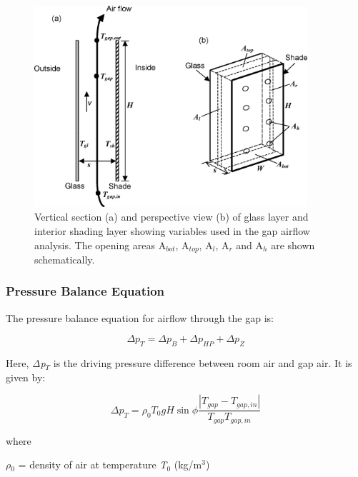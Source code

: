 \begin{figure}[hbtp] %
\centering
\includegraphics[width=0.9\textwidth, height=0.9\textheight, keepaspectratio=true]{media/image1670.png}
\caption{Vertical section (a) and perspective view (b) of glass layer and interior shading layer showing variables used in the gap airflow analysis. The opening areas A\(_{bot}\), A\(_{top}\), A\(_{l}\), A\(_{r}\) and A\(_{h}\) are shown schematically. \protect \label{fig:vertical-section-a-and-perspective-view-b-of}}
\end{figure}

\subsubsection{Pressure Balance Equation}\label{pressure-balance-equation}

The pressure balance equation for airflow through the gap is:

\begin{equation}
\Delta {p_T} = \Delta {p_B} + \Delta {p_{HP}} + \Delta {p_Z}
\label{eq:PressureBalanceEquationAirflow}
\end{equation}

Here, \emph{Δp\(_{T}\)} is the driving pressure difference between room air and gap air. It is given by:

\begin{equation}
\Delta {p_T} = {\rho_0}{T_0}gH\sin \phi \frac{{\left| {{T_{gap}} - {T_{gap,in}}} \right|}}{{{T_{gap}}{T_{gap,in}}}}
\end{equation}

where

\emph{$\rho$\(_{0}\)} = density of air at temperature \emph{T\(_{0}\)} (kg/m\(^{3}\))

